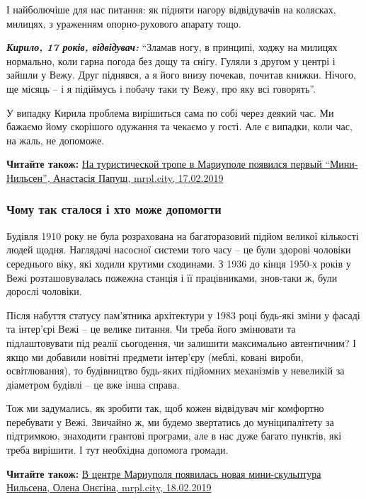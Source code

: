 І найболючіше для нас питання: як підняти нагору відвідувачів на колясках,
милицях, з ураженням опорно-рухового апарату тощо. 

\textbf{\emph{Кирило, 17 років, відвідувач:}} \enquote{Зламав ногу, в принципі, ходжу на милицях
нормально, коли гарна погода без дощу та снігу. Гуляли з другом у центрі і
зайшли у Вежу. Друг піднявся, а я його внизу почекав, почитав книжки. Нічого,
ще місяць – і я підіймусь і побачу таки ту Вежу, про яку всі говорять}.

У випадку Кирила проблема вирішиться сама по собі через деякий час. Ми бажаємо
йому скорішого одужання та чекаємо у гості. Але є випадки, коли час, на жаль,
не допоможе.

\textbf{Читайте також:} \href{https://mrpl.city/news/view/na-turisticheskoj-trope-v-mariupole-poyavilsya-pervyj-mini-nilsen}{%
На туристической тропе в Мариуполе появился первый \enquote{Мини-Нильсен},%
Анастасія Папуш, mrpl.city, 17.02.2019%
}

\subsubsection{Чому так сталося і хто може допомогти}

Будівля 1910 року не була розрахована на багаторазовий підйом великої кількості
людей щодня. Наглядачі насосної системи того часу – це були здорові чоловіки
середнього віку, які ходили крутими сходинами. З 1936 до кінця 1950-х років у
Вежі розташовувалась пожежна станція і її працівниками, знов-таки ж, були
дорослі чоловіки.

Після набуття статусу пам'ятника архітектури у 1983 році будь-які зміни у
фасаді та інтер'єрі Вежі – це велике питання. Чи треба його змінювати та
підлаштовувати під реалії сьогодення, чи залишити максимально автентичним? І
якщо ми добавили новітні предмети інтер'єру (меблі, ковані вироби,
освітлювання), то будівництво будь-яких підйомних механізмів у невеликій за
діаметром будівлі – це вже інша справа.

Тож ми задумались, як зробити так, щоб кожен відвідувач міг комфортно
перебувати у Вежі. Звичайно ж, ми будемо звертатись до муніципалітету за
підтримкою, знаходити грантові програми, але в нас дуже багато пунктів, які
треба вирішити. І тут необхідна допомога громади.

\textbf{Читайте також:} \href{https://mrpl.city/news/view/v-tsentre-mariupolya-poyavilas-novaya-mini-skulptura-nilsena-foto}{%
В центре Мариуполя появилась новая мини-скульптура Нильсена, %
Олена Онєгіна, mrpl.city, 18.02.2019%
}

